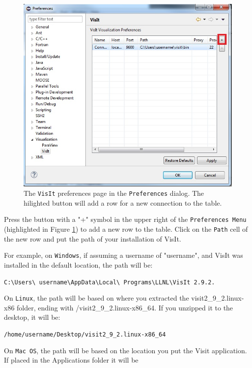 \begin{figure}[!h]
\includegraphics[width=12cm]{images/VisualizationPreferences}
\centering
\caption{The \texttt{VisIt} preferences page in the \texttt{Preferences}
dialog. The hilighted button will add a row for a new connection to the table.}
\label{fig:visualizationpreferences}
\end{figure}


Press the button with a "+" symbol in the upper right of the
\texttt{Preferences Menu} (highlighted in Figure
\ref{fig:visualizationpreferences}) to add a new row to the table.
Click on the \texttt{Path} cell of the new row and put the path of your installation of VisIt.

For example, on \texttt{Windows}, if assuming a username of "username", and
VisIt was installed in the default location, the path will be:

\texttt{C:\textbackslash Users\textbackslash
username\textbackslash AppData\textbackslash Local\textbackslash
Programs\textbackslash LLNL\textbackslash VisIt 2.9.2.}

On \texttt{Linux}, the path will be based on where you extracted the 
visit2\_9\_2.linux-x86 folder, ending with /visit2\_9\_2.linux-x86\_64. If
you unzipped it to the desktop, it will be:
 
\texttt{/home/username/Desktop/visit2\_9\_2.linux-x86\_64}

On \texttt{Mac OS}, the path will be based on the location you put the Visit
application. If placed in the Applications folder it will be

